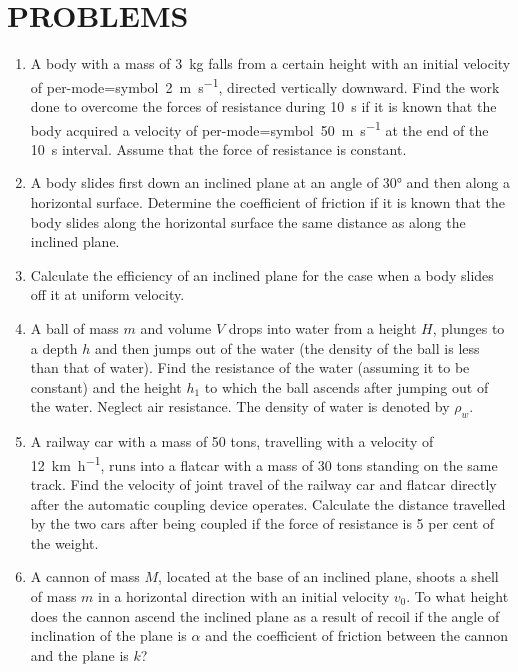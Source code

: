\documentclass[a4paper,sfsidenotes]{tufte-book}
\begin{document}
\section{PROBLEMS}
\label{problems-05}

\begin{enumerate}[resume*=problems]
\item A body with a mass of \SI{3}{\kilogram} falls from a certain height with an initial velocity of \SI{2}[per-mode=symbol]{\meter\per\second}, directed vertically downward. Find the work done to overcome the forces of resistance during \SI{10}{\second} if it is known that the body acquired a velocity of \SI{50}[per-mode=symbol]{\meter\per\second} at the end of the \SI{10}{\second} interval. Assume that the force of resistance is constant.

\item A body slides first down an inclined plane at an angle of \ang{30} and then along a horizontal surface. Determine the coefficient of friction if it is known that the body slides along the horizontal surface the same distance as along the inclined plane.

\item Calculate the efficiency of an inclined plane for the case when a body slides off it at uniform velocity.

\item A ball of mass $m$ and volume $V$ drops into water from a height $H$, plunges to a depth $h$ and then jumps out of the water (the density of the ball is less than that of water). Find the resistance of the water (assuming it to be constant) and the height $h_{1}$ to which the ball ascends after jumping
out of the water. Neglect air resistance. The density of water is denoted by $\rho_{w}$.

\item A railway car with a mass of 50 tons, travelling with a velocity of \SI[per-mode=symbol]{12}{\kilo\meter\per\hour}, runs into a flatcar with a mass of 30 tons standing on the same track. Find the velocity of joint travel of the railway car and flatcar directly after the automatic coupling device operates. Calculate the distance travelled by the two cars after being coupled if the force of resistance is 5 per cent of the weight.

\item A cannon of mass $M$, located at the base of an inclined plane, shoots a shell of mass $m$ in a horizontal direction with an initial velocity $v_{0}$. To what height does the cannon ascend the inclined plane as a result of recoil if the angle of inclination of the plane is $\alpha$ and the coefficient of friction between the cannon and the plane is $k$?


\end{enumerate}
\end{document}

